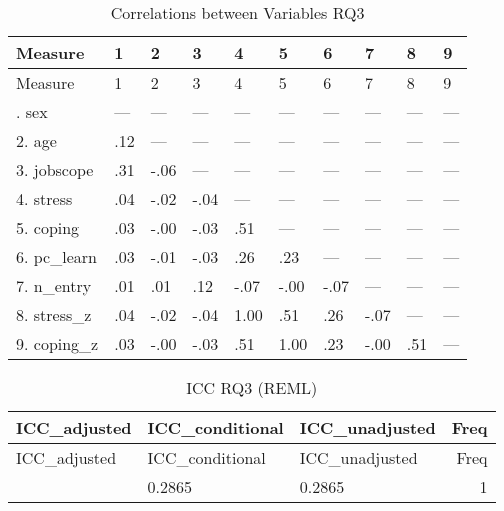 \documentclass[
]{article}
\begin{document}
\begin{longtable}[]{@{}llllllllll@{}}
\caption{Correlations between Variables RQ3}\tabularnewline
\toprule\noalign{}
Measure & 1 & 2 & 3 & 4 & 5 & 6 & 7 & 8 & 9 \\
\midrule\noalign{}
\endfirsthead
\toprule\noalign{}
Measure & 1 & 2 & 3 & 4 & 5 & 6 & 7 & 8 & 9 \\
\midrule\noalign{}
\endhead
\bottomrule\noalign{}
\endlastfoot
1. sex & --- & --- & --- & --- & --- & --- & --- & --- & --- \\
2. age & .12 & --- & --- & --- & --- & --- & --- & --- & --- \\
3. jobscope & .31 & -.06 & --- & --- & --- & --- & --- & --- & --- \\
4. stress & .04 & -.02 & -.04 & --- & --- & --- & --- & --- & --- \\
5. coping & .03 & -.00 & -.03 & .51 & --- & --- & --- & --- & --- \\
6. pc\_learn & .03 & -.01 & -.03 & .26 & .23 & --- & --- & --- & --- \\
7. n\_entry & .01 & .01 & .12 & -.07 & -.00 & -.07 & --- & --- & --- \\
8. stress\_z & .04 & -.02 & -.04 & 1.00 & .51 & .26 & -.07 & --- &
--- \\
9. coping\_z & .03 & -.00 & -.03 & .51 & 1.00 & .23 & -.00 & .51 &
--- \\
\end{longtable}

\begin{longtable}[]{@{}lllr@{}}
\caption{ICC RQ3 (REML)}\tabularnewline
\toprule\noalign{}
ICC\_adjusted & ICC\_conditional & ICC\_unadjusted & Freq \\
\midrule\noalign{}
\endfirsthead
\toprule\noalign{}
ICC\_adjusted & ICC\_conditional & ICC\_unadjusted & Freq \\
\midrule\noalign{}
\endhead
\bottomrule\noalign{}
\endlastfoot
0.2865 & 0.2865 & 0.2865 & 1 \\
\end{longtable}
\end{document}
